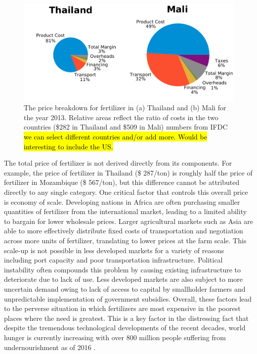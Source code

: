 \begin{figure}
    \centering
    \includegraphics[width=1\textwidth]{Figures/Cost_Breakdown.pdf}
    \caption{The price breakdown for fertilizer in (a) Thailand and (b) Mali for the year 2013. Relative areas reflect the ratio of costs in the two countries (\$282 in Thailand and  \$509 in Mali) numbers from IFDC\cite{Wanzala2013} \hl{we can select different countries and/or add more. Would be interesting to include the US.}}
    \label{fig:cost_pies}
\end{figure}

The total price of fertilizer is not derived directly from its components. For example, the price of fertilizer in Thailand (\$ 287/ton) is roughly half the price of fertilizer in Mozambique (\$ 567/ton), but this difference cannot be attributed directly to any single category. One critical factor that controls this overall price is economy of scale. Developing nations in Africa are often purchasing smaller quantities of fertilizer from the international market, leading to a limited ability to bargain for lower wholesale prices.\cite{Wanzala2013} Larger agricultural markets such as Asia are able to more effectively distribute fixed costs of transportation and negotiation across more units of fertilizer, translating to lower prices at the farm scale. This scale-up is not possible in less developed markets for a variety of reasons including port capacity and poor transportation infrastructure. \needcite Political instability often compounds this problem by causing existing infrastructure to deteriorate due to lack of use. \needcite Less developed markets are also subject to more uncertain demand owing to lack of access to capital by smallholder farmers and unpredictable implementation of government subsidies. Overall, these factors lead to the perverse situation in which fertilizers are most expensive in the poorest places where the need is greatest. This is a key factor in the distressing fact that despite the tremendous technological developments of the recent decades, world hunger is currently increasing with over 800 million people suffering from undernourishment as of 2016 \cite{FAO_2017}.




